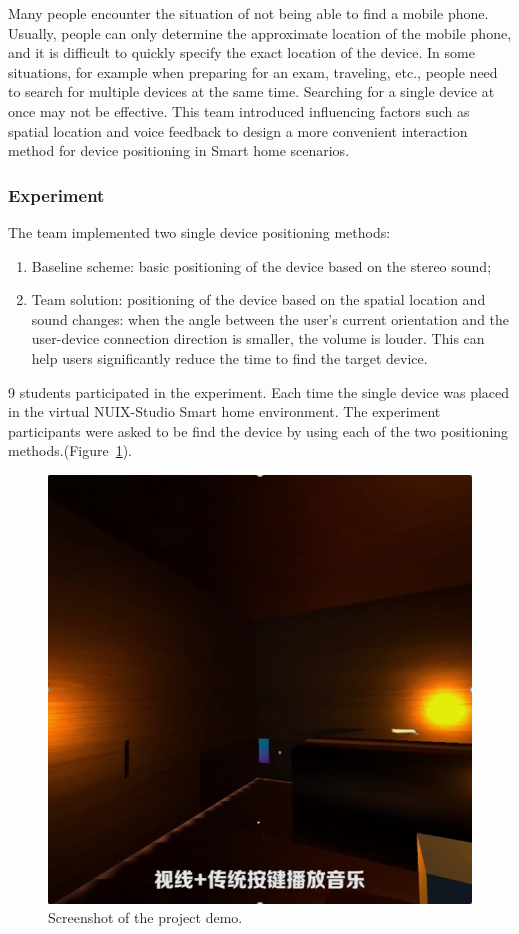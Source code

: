 Many people encounter the situation of not being able to find a mobile phone. Usually, people can only determine the approximate location of the mobile phone, and it is difficult to quickly specify the exact location of the device. 
In some situations, for example when preparing for an exam, traveling, etc., people need to search for multiple devices at the same time. Searching for a single device at once may not be effective.
This team introduced influencing factors such as spatial location and voice feedback to design a more convenient interaction method for device positioning in Smart home scenarios. 

\subsubsection{Experiment}
The team implemented two single device positioning methods:
\begin{enumerate}
    \item Baseline scheme: basic positioning of the device based on the stereo sound;
    \item Team solution: positioning of the device based on the spatial location and sound changes: when the angle between the user's current orientation and the user-device connection direction is smaller, the volume is louder. This can help users significantly reduce the time to find the target device. 
\end{enumerate}

9 students participated in the experiment. Each time the single device was placed in the virtual NUIX-Studio Smart home environment. The experiment participants were asked to be find the device by using each of the two positioning methods.(Figure~\ref{fig:Project1-1-figure}).

\begin{figure}
  \centering
  \includegraphics[width=0.9\linewidth]{figures/Project_1-1.png}
  \caption{Screenshot of the project demo.}
  \label{fig:Project1-1-figure}
\end{figure}

